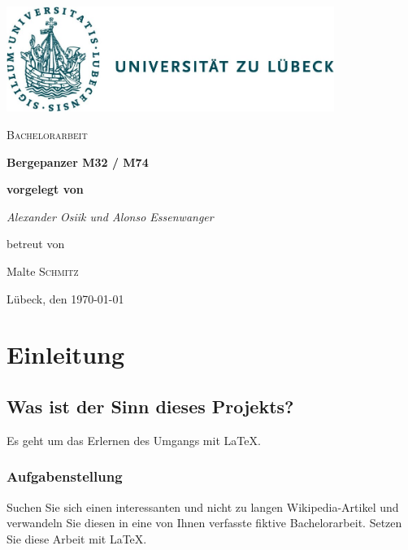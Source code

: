 \documentclass[12pt,a4paper]{report}
\begin{document}
\begin{titlepage}
	\centering
	\includegraphics[width=0.8\textwidth]{Hochschule_162}\par\vspace{1cm}
	\vspace{1cm}
	{\scshape\Large Bachelorarbeit\par}
	\vspace{1.5cm}
	{\huge\bfseries Bergepanzer M32 / M74\par}
	\vspace{2cm}
	{\small\bf vorgelegt von\par}
	{\Large\itshape Alexander Osiik und Alonso Essenwanger\par}
	\vfill
	betreut von\par
	Malte \textsc{Schmitz}

	\vfill

	{\large L\"ubeck, den \today\par}
\end{titlepage}
\pagebreak

\tableofcontents 
\begin{abstract} 
In dieser Bachelorarbeit geht es um den Bergepanzer M32/M74. Diese basierten basierten auf dem Chassis des M4 Sherman und waren die ersten Bergepanzer der US Army mit Kranausstattung. 
\end{abstract} 
\newpage
\renewcommand\abstractname{Summary}   
\begin{abstract} 
This bachelor's thesis deals with the armoured recovery vehicle M32/M74. These were based on the chassis of the M4 Sherman and were the first armoured recovery vehicle of the US Army with crane equipment.  
\end{abstract} 
\chapter{Einleitung} 
\section{Was ist der Sinn dieses Projekts?} 
Es geht um das Erlernen des Umgangs mit \LaTeX. 
\subsection{Aufgabenstellung} 
Suchen Sie sich einen interessanten und nicht zu langen Wikipedia-Artikel und verwandeln Sie diesen in eine von Ihnen verfasste fiktive Bachelorarbeit. Setzen Sie diese Arbeit mit \LaTeX. 
\end{document}
